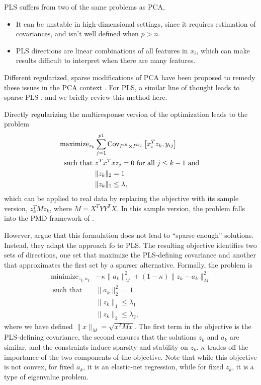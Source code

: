 \documentclass{article}
\begin{document}
PLS suffers from two of the same problems as PCA,
\begin{itemize}
\item It can be unstable in high-dimensional settings, since it requires
  estimation of covariances, and isn't well defined when $p > n$.
\item PLS directions are linear combinations of all features in $x_i$, which can
  make results difficult to interpret when there are many features.
\end{itemize}

Different regularized, sparse modifications of PCA have been proposed to remedy
these issues in the PCA context \citep{zou2006sparse, witten2009penalized}. For
PLS, a similar line of thought leads to sparse PLS \citep{chun2010sparse}, and
we briefly review this method here.

Directly regularizing the multiresponse version of the
optimization \label{eq:pls_obj} leads to the problem
\begin{align*}
  \text{maximize}_{z_k} &\sum_{j = 1}^{p1} \mathrm{Cov}_{P^X \times P^{y_j}}\left[{x_i^T z_k, y_{ij}}\right] \\
  \text{such that }&z^{T}x^{T}x z_{j} = 0 \text{ for all }j
  \leq k - 1 \text{ and } \\
  &\|z_k\|_2 = 1 \\
  &\|z_k\|_1 \leq \lambda,
\end{align*}
which can be applied to real data by replacing the objective with its sample
version, $z_k^{T} M z_k$, where $M = X^{T}YY^{T}X$. In this sample version, the
problem falls into the PMD framework of \citep{witten2009penalized}.

However, \cite{chun2010sparse} argue that this formulation does not lead to
``sparse enough'' solutions. Instead, they adapt the approach fo
\cite{zou2006sparse} to PLS. The resulting objective identifies two sets of
directions, one set that maximize the PLS-defining covariance and another that
approximates the first set by a sparser alternative. Formally, the problem is
\begin{align*}
  \text{minimize}_{z_k, a_k} &-\kappa \|a_k\|_M^2 + \left(1 - \kappa\right) \|z_k - a_k\|_M^2 \\
  \text{ such that } & \|a_k\|_2^2 = 1 \\
  &\|z_k\|_1 \leq \lambda_1 \\
  &\|z_k\|_2 \leq \lambda_2,
\end{align*}
where we have defined $\|x\|_M = \sqrt{x^T M x}$. The first term in the
objective is the PLS-defining covariance, the second ensures that the solutions
$z_k$ and $a_k$ are similar, and the constraints induce sparsity and stability
on $z_k$. $\kappa$ trades off the importance of the two components of the
objective. Note that while this objective is not convex, for fixed $a_k$, it is
an elastic-net regression, while for fixed $z_k$, it is a type of eigenvalue
problem.
\end{document}
